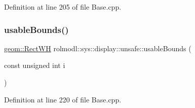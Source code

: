 Definition at line 205 of file Base.\+cpp.

\mbox{\label{namespacerolmodl_1_1sys_1_1display_1_1unsafe_ad298fc79a292b5f66a81a818a38d2766}} 
\subsubsection{\texorpdfstring{usableBounds()}{usableBounds()}}
{\footnotesize\ttfamily \mbox{\hyperlink{structrolmodl_1_1geom_1_1_rect_w_h}{geom\+::\+Rect\+WH}} rolmodl\+::sys\+::display\+::unsafe\+::usable\+Bounds (\begin{DoxyParamCaption}\item[{const unsigned int}]{i }\end{DoxyParamCaption})}



Definition at line 220 of file Base.\+cpp.

